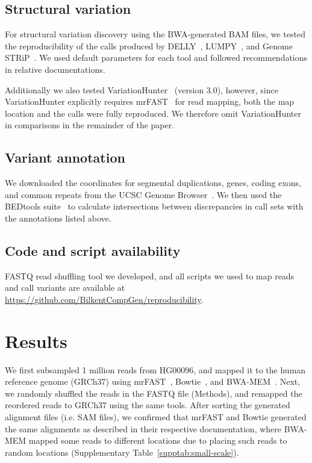 \documentclass[10pt,a4paper]{article}
\begin{document}
\subsection{Structural variation}

For structural variation discovery using the BWA-generated BAM files, we tested the reproducibility of the calls produced by DELLY~\cite{Rausch2012}, LUMPY~\cite{Layer2014}, and Genome STRiP~\cite{Handsaker2011,Handsaker2015}. 
We used default parameters for each tool and followed recommendations in relative documentations.

Additionally we also tested VariationHunter~\cite{Hormozdiari2009,Hormozdiari2010} (version 3.0), however, since VariationHunter explicitly requires mrFAST~\cite{Alkan2009,Xin2013} for read mapping, 
both the map location and the calls were fully reproduced. We therefore omit VariationHunter in comparisons in the remainder of the paper.

\subsection{Variant annotation}

We downloaded the coordinates for segmental duplications, genes, coding exons, and common repeats from the UCSC Genome Browser~\cite{Kent2002}. 
We then used the BEDtools suite~\cite{Quinlan2010a} to calculate intersections between discrepancies in call sets with the annotations listed above.

\subsection{Code and script availability} FASTQ read shuffling tool we developed, and all scripts we used to map reads and call variants are available at 
\url{https://github.com/BilkentCompGen/reproducibility}.

\section{Results}
We first subsampled 1 million reads from HG00096, and mapped it to the human reference genome (GRCh37) using mrFAST~\cite{Alkan2009,Xin2013}, Bowtie~\cite{Langmead2009}, and BWA-MEM~\cite{Li2009a,Li2013}.
Next, we randomly shuffled the reads in the FASTQ file (Methods), and remapped the reordered reads to GRCh37 using the same tools.
After sorting the generated alignment files (i.e. SAM files), we confirmed that mrFAST and Bowtie generated the same alignments as described in their respective documentation, 
where BWA-MEM mapped some reads to different locations due to placing 
such reads to random locations (Supplementary Table~\ref{supptab:small-scale}).
\end{document}
